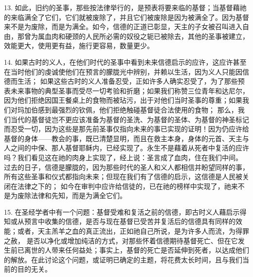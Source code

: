 13. 如此，旧约的圣事，那些按法律举行的，是预表将要来临的基督；当基督藉祂的来临满全了它们，它们就被废除了，并且它们被废除是因为被满全了。因为基督来不是为废除，而是为满全。如今，信德的正道已彰显，天主的子女被召叫进入自由，那曾为属血肉和硬颈的人民所必需的奴役之轭已被除去，其他的圣事被建立，效能更大，使用更有益，施行更容易，数量更少。\par

14. 如果古时的义人，在他们时代的圣事中看到未来信德启示的应许，这应许甚至在当时他们的虔诚使他们在预言的朦胧光中辨别，并赖以生活，因为义人只能因信德而生活； 如果这些古时的义人准备忍受，正如许多人确实忍受了，为了那些预表未来事物的典型圣事而受尽一切考验和折磨；如果我们称赞三位青年和达尼尔，因为他们拒绝因国王餐桌上的食物而被玷污，出于对他们当时圣事的尊重；如果我们对玛加伯感到最强烈的钦佩，他们拒绝触碰基督徒合法使用的食物； 那么，我们当代的基督徒岂不更应该准备为基督的圣洗、为基督的圣体、为基督的神圣标记而忍受一切，因为这些是那先前圣事仅指向未来的事已实现的证明！因为仍应许给基督的身体——教会的事，既已清楚显明，而且在救主本身，身体的元首、天主与人之间的中保、那人基督耶稣内，已经实现了。永生不是藉着从死者中复活的应许吗？我们看见这在祂的肉身上实现了，经上说：圣言成了血肉，住在我们中间。 过去的日子，信德是朦胧的，因为那些时代的圣人和义人都相信并盼望同样的事，所有这些圣事和仪式都指向未来；但现在我们有了信德的启示，这信德是人民被关闭在法律之下的； 如今在审判中应许给信徒的，已在祂的榜样中实现了，祂来不是为废除法律和先知，而是为满全它们。\par

15. 在圣经学者中有一个问题：基督受难和复活之前的信德，即古时义人藉启示得知或从预言中收集的信德，是否与现在基督已受苦并复活后的信德具有同样的效能；或者，天主羔羊之血的真正流出，正如祂自己所说，是为许多人而流，为得罪之赦， 是否以净化或增加纯洁的方式，对那些怀着信德期待基督死亡、但在它发生前已离世的人带来任何益处；事实上，基督的死亡是否延伸到死者，以达成他们的解放。在此讨论这个问题，或证明已确定的主题，将花费太长时间，且与我们当前的目的无关。\par

